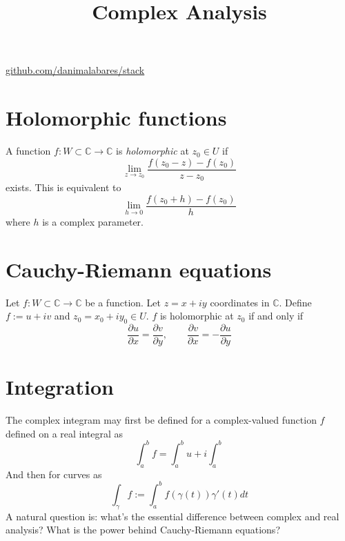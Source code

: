 



\title{Complex Analysis}
\maketitle

\label{section-phantom}
\hfill
\href{http://github.com/danimalabares/stack}{github.com/danimalabares/stack}

\tableofcontents

\section{Holomorphic functions}
\label{section-holomorphic-functions}

\begin{definition}
\label{definition-holomorphic-function}
A function $f:W\subset \mathbb{C} \to \mathbb{C}$ is {\it holomorphic} at $z_0
\in U$ if
$$
\lim_{z\to z_0} \frac{f(z_0-z)-f(z_0)}{z-z_0}
$$
exists. This is equivalent to
$$
\lim_{h\to 0} \frac{f(z_0+h)-f(z_0)}{h}
$$
where $h$ is a complex parameter.
\end{definition}

\section{Cauchy-Riemann equations}
\label{section-Cauchy-Riemann-equations}

\begin{theorem}
\label{theorem-Cauchy-Riemann}
Let $f:W\subset\mathbb{C}\to \mathbb{C}$ be a function. Let $z=x+iy$ coordinates
in $\mathbb{C}$. Define $f:=u+iv$ and
$z_0=x_0+iy_0 \in U$. $f$ is holomorphic at $z_0$ if and only if
$$
\frac{\partial u}{\partial x}=\frac{\partial v}{\partial y},\qquad \frac{\partial v}{\partial x}=-\frac{\partial u}{\partial y}
$$
\end{theorem}

\section{Integration}
\label{section-integration}

The complex integram may first be defined for a complex-valued function $f$
defined on a real integral as
$$
\int_a^bf=\int_a^b u + i \int_a^b
$$
And then for curves as
$$
\int_\gamma f:=\int_a^b f(\gamma(t))\gamma'(t)dt
$$
A natural question is: what's the essential difference between complex and real
analysis? What is the power behind Cauchy-Riemann equations?

